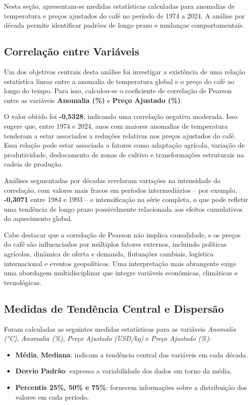 \documentclass[12pt]{article}
\begin{document}
Nesta seção, apresentam-se medidas estatísticas calculadas para anomalias de temperatura e preços ajustados do café no período de 1974 a 2024. A análise por década permite identificar padrões de longo prazo e mudanças comportamentais.

\subsection{Correlação entre Variáveis}
Um dos objetivos centrais desta análise foi investigar a existência de uma relação estatística linear entre a anomalia de temperatura global e o preço do café ao longo do tempo. Para isso, calculou-se o coeficiente de correlação de Pearson entre as variáveis \textbf{Anomalia (\%)} e \textbf{Preço Ajustado (\%)}.

O valor obtido foi \textbf{-0,5328}, indicando uma correlação negativa moderada. Isso sugere que, entre 1974 e 2024, anos com maiores anomalias de temperatura tenderam a estar associados a reduções relativas nos preços ajustados do café. Essa relação pode estar associada a fatores como adaptação agrícola, variação de produtividade, deslocamento de zonas de cultivo e transformações estruturais na cadeia de produção.

Análises segmentadas por décadas revelaram variações na intensidade da correlação, com valores mais fracos em períodos intermediários -- por exemplo, \textbf{-0,3071} entre 1984 e 1993 -- e intensificação na série completa, o que pode refletir uma tendência de longo prazo possivelmente relacionada aos efeitos cumulativos do aquecimento global.

Cabe destacar que a correlação de Pearson não implica causalidade, e os preços do café são influenciados por múltiplos fatores externos, incluindo políticas agrícolas, dinâmica de oferta e demanda, flutuações cambiais, logística internacional e eventos geopolíticos. Uma interpretação mais abrangente exige uma abordagem multidisciplinar que integre variáveis econômicas, climáticas e tecnológicas.

\subsection{Medidas de Tendência Central e Dispersão}
Foram calculadas as seguintes medidas estatísticas para as variáveis \textit{Anomalia (°C)}, \textit{Anomalia (\%)}, \textit{Preço Ajustado (USD/kg)} e \textit{Preço Ajustado (\%)}:

\begin{itemize}
  \item \textbf{Média}, \textbf{Mediana}: indicam a tendência central das variáveis em cada década.
  \item \textbf{Desvio Padrão}: expressa a variabilidade dos dados em torno da média.
  \item \textbf{Percentis 25\%, 50\% e 75\%}: fornecem informações sobre a distribuição dos valores em cada período.
\end{itemize}
\end{document}
